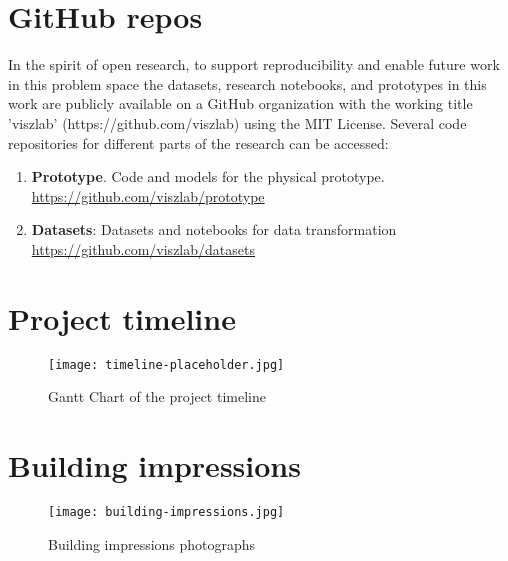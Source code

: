 \newpage

\appendix

\begin{appendices}


\section{GitHub repos}

In the spirit of open research, to support reproducibility and enable future work in this problem space the datasets, research notebooks, and prototypes in this work are publicly available on a GitHub organization with the working title 'viszlab' (https://github.com/viszlab) using the MIT License. Several code repositories for different parts of the research can be accessed:

\begin{enumerate}
  \item \textbf{Prototype}. Code and models for the physical prototype.\\
  \underline{https://github.com/viszlab/prototype}
  \item \textbf{Datasets}: Datasets and notebooks for data transformation  \\
  \underline{https://github.com/viszlab/datasets}
\end{enumerate}


\section{Project timeline}

\begin{figure}[H]
    \centering
    \captionsetup{justification=centering}
    \texttt{[image: timeline-placeholder.jpg]}
    \caption{Gantt Chart of the project timeline}
    \label{fig:timeline}
\end{figure}

\section{Building impressions}

\begin{figure}[H]
    \centering
    \captionsetup{justification=centering}
    \texttt{[image: building-impressions.jpg]}
    \caption{Building impressions photographs}
    \label{fig:building}
\end{figure}

\end{appendices}